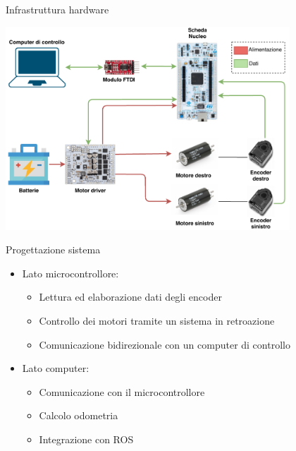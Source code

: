 \documentclass{beamer}
\begin{document}
\begin{tframe}{Infrastruttura hardware}
\begin{center}
    \includegraphics[width=0.8\textwidth]{img/infrastruttura.pdf}
\end{center}
\end{tframe}

\begin{tframe}{Progettazione sistema}
\begin{itemize}
\item Lato microcontrollore:
\begin{itemize}
    \item Lettura ed elaborazione dati degli encoder
    \item Controllo dei motori tramite un sistema in retroazione
    \item Comunicazione bidirezionale con un computer di controllo
\end{itemize}
\item Lato computer:
 \begin{itemize}
    \item Comunicazione con il microcontrollore
    \item Calcolo odometria
    \item Integrazione con ROS
\end{itemize}
\end{itemize}

\end{tframe}
\end{document}
